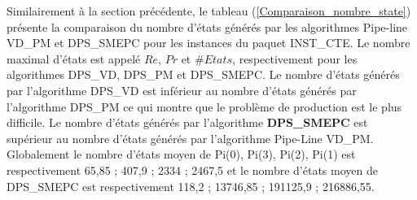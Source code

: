 Similairement à la section précédente, le tableau (\ref{Comparaison_nombre_state}) présente la comparaison du nombre d'états générés par les algorithmes Pipe-line VD\_PM et DPS\_SMEPC pour les instances du paquet INST\_CTE. Le nombre maximal d'états est appelé $Re$, $Pr$ et $\# Etats$, respectivement pour les algorithmes DPS\_VD, DPS\_PM et DPS\_SMEPC. Le nombre d'états générés par l'algorithme DPS\_VD est inférieur au nombre d'états générés par l'algorithme DPS\_PM ce qui montre que le problème de production est le plus difficile. Le nombre d'états générés par l'algorithme \textbf{DPS\_SMEPC} est supérieur au nombre d'états générés par l'algorithme Pipe-Line VD\_PM.
Globalement le nombre d'états moyen de Pi(0), Pi(3), Pi(2), Pi(1) est respectivement 65,85 ; 407,9 ; 2334 ; 2467,5 
et le nombre d'états moyen de DPS\_SMEPC est respectivement 118,2 ; 13746,85 ; 191125,9 ; 216886,55. 
